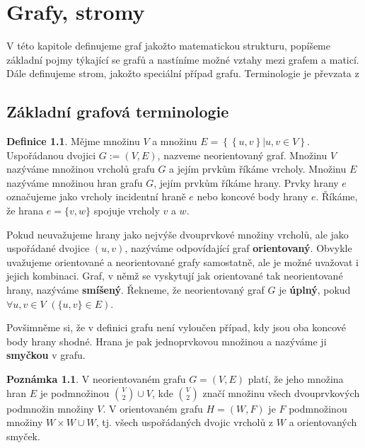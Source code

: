 \documentclass[11pt,american,czech,oneside]{book}
\theoremstyle{plain}
\theoremstyle{definition}
\newtheorem{definition}{Definice}
\newtheorem{remark}{Poznámka}
\begin{document}

\chapter{Grafy, stromy}
V této kapitole definujeme graf jakožto matematickou strukturu, popíšeme základní pojmy týkající se grafů a nastíníme možné vztahy mezi grafem a maticí. Dále definujeme strom, jakožto speciální případ grafu. Terminologie je převzata z \cite{koub:11}

\section{Základní grafová terminologie}

\begin{definition}
  Mějme množinu $V$ a množinu $E = \left\{ \left\{ u,v \right\} | u,v \in V \right\}$. Uspořádanou dvojici $G := (V,E)$, nazveme neorientovaný graf. Množinu $V$ nazýváme množinou vrcholů grafu $G$ a jejím prvkům říkáme vrcholy. Množinu $E$ nazýváme množinou hran grafu $G$, jejím prvkům říkáme hrany. Prvky hrany $e$ označujeme jako vrcholy incidentní hraně $e$ nebo koncové body hrany $e$. Říkáme, že hrana $e = \{v,w\}$ spojuje vrcholy $v$ a $w$.
\end{definition}

Pokud neuvažujeme hrany jako nejvýše dvouprvkové množiny vrcholů, ale  jako uspořádané dvojice $(u,v)$, nazýváme odpovídající graf \textbf{orientovaný}. Obvykle uvažujeme orientované a neorientované grafy samostatně, ale je možné uvažovat i jejich kombinaci. Graf, v němž se vyskytují jak orientované tak neorientované hrany, nazýváme \textbf{smíšený}. Řekneme, že neorientovaný graf $G$ je \textbf{úplný}, pokud $\forall u, v \in V$ $\left(\{u,v\} \in E\right)$.

Povšimněme si, že v definici grafu není vyloučen případ, kdy jsou oba koncové body hrany shodné. Hrana je pak jednoprvkovou množinou a nazýváme ji \textbf{smyčkou} v grafu.

\begin{remark}
  V neorientovaném grafu $G=(V,E)$ platí, že jeho množina hran $E$ je podmnožinou ${V \choose 2} \cup V$, kde $V \choose 2$ značí množinu všech dvouprvkových podmnožin množiny $V$. V orientovaném grafu $H=(W,F)$ je $F$ podmnožinou množiny $W \times W \cup W$, tj. všech uspořádaných dvojic vrcholů z $W$ a orientovaných smyček.
\end{remark}
\end{document}
